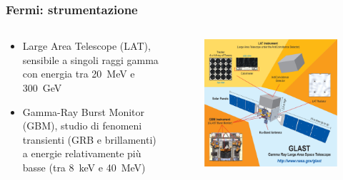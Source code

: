 \documentclass[10pt]{beamer}
\begin{document}
\begin{frame}
  \frametitle{Fermi: strumentazione}
  \begin{columns}
    \begin{column}{0.4\columnwidth}
      \begin{itemize}
      \item \alert{Large Area Telescope} (LAT), sensibile a singoli raggi gamma
        con energia tra \SI{20}{\mega\electronvolt} e
        \SI{300}{\giga\electronvolt}
      \item \alert{Gamma-Ray Burst Monitor} (GBM), studio di fenomeni transienti
        (GRB e brillamenti) a energie relativamente più basse (tra
        \SI{8}{\kilo\electronvolt} e \SI{40}{\mega\electronvolt})
      \end{itemize}
    \end{column}
    \begin{column}{0.6\columnwidth}
      \begin{figure}
        \centering
        \includegraphics[width=\columnwidth]{glast_schematic.jpg}
      \end{figure}
    \end{column}
  \end{columns}
\end{frame}
\end{document}
